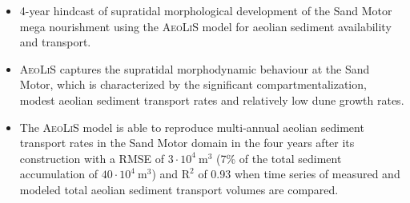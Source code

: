 \documentclass{article}
\begin{document}
\begin{itemize}
\item 4-year hindcast of supratidal morphological development of the
  Sand Motor mega nourishment using the \textsc{AeoLiS} model for
  aeolian sediment availability and transport.
\item \textsc{AeoLiS} captures the supratidal morphodynamic behaviour
  at the Sand Motor, which is characterized by the significant
  compartmentalization, modest aeolian sediment transport rates and
  relatively low dune growth rates.
\item The \textsc{AeoLiS} model is able to reproduce multi-annual
  aeolian sediment transport rates in the Sand Motor domain in the
  four years after its construction with a RMSE of $3 \cdot 10^4 ~
  \mathrm{m^3}$ (7\% of the total sediment accumulation of $40 \cdot
  10^4 ~ \mathrm{m^3}$) and $\mathrm{R^2}$ of 0.93 when time series of
  measured and modeled total aeolian sediment transport volumes are
  compared.
\end{itemize}
\end{document}
